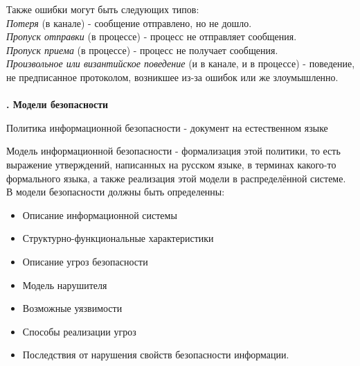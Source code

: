 Также ошибки могут быть следующих типов:\\
\textit{Потеря} (в канале) - сообщение отправлено, но не дошло. \\
\textit{Пропуск отправки} (в процессе) - процесс не отправляет сообщения.\\
\textit{Пропуск приема} (в процессе) - процесс не получает сообщения.\\
\textit{Произвольное или византийское поведение} (и в канале, и в процессе) - поведение, не предписанное протоколом, возникшее из-за ошибок или же злоумышленно.\\
\\
\newpage
\textbf{. Модели безопасности}

Политика информационной безопасности - документ на естественном языке

Модель информационной безопасности - формализация этой политики, то есть выражение утверждений, написанных на русском языке, в терминах какого-то формального языка, а также реализация этой модели в распределённой системе. \\

В модели безопасности должны быть определенны:
\begin{itemize}
\item Описание информационной системы
\item Структурно-функциональные характеристики
\item Описание угроз безопасности
\item Модель нарушителя
\item Возможные уязвимости
\item Способы реализации угроз
\item Последствия от нарушения свойств безопасности информации.
\end{itemize}





